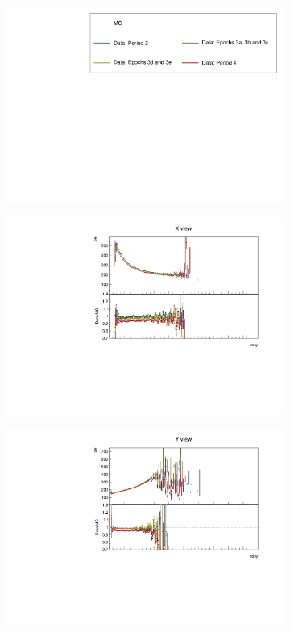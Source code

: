 \documentclass[12pt,a4paper]{article}
\begin{document}
\begin{figure}[!ht]
  \begin{subfigure}{\textwidth}
  \centering
    \includegraphics[height=0.2\linewidth]{essentialsec_tb/legend.pdf}
  \end{subfigure}
  \vspace*{2mm}

  \begin{subfigure}{0.5\textwidth}
    \includegraphics[width=\linewidth]{PlotsAngularDistribution/pe_cosy_x.pdf}
  \end{subfigure}
  \begin{subfigure}{0.5\textwidth}
    \includegraphics[width=\linewidth]{PlotsAngularDistribution/pe_cosy_y.pdf}

\end{subfigure}
\end{figure}
\end{document}
